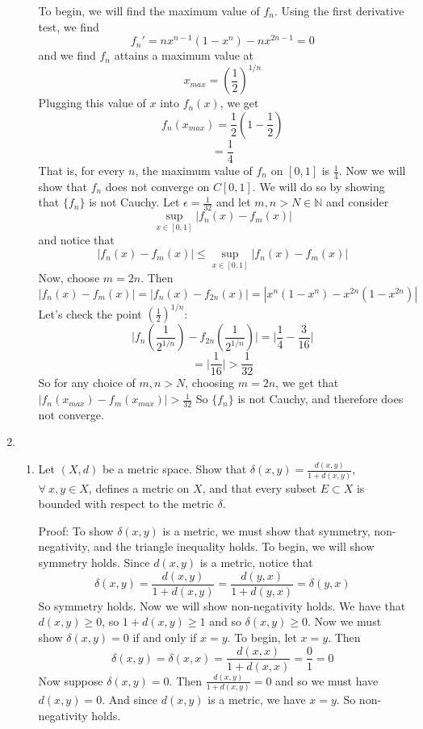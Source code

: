 \documentclass{article}
\begin{document}
\begin{enumerate}
\begin{enumerate}
        To begin, we will find the maximum value of $f_n$. Using the first derivative test, we find
        \[f_n' = nx^{n-1}(1 - x^n) - nx^{2n-1} = 0\]
        and we find $f_n$ attains a maximum value at 
        \[x_{max} = \left(\frac{1}{2}\right)^{1/n}\]
        Plugging this value of $x$ into $f_n(x)$, we get
        \[f_n(x_{max}) = \frac{1}{2}\left(1 - \frac{1}{2}\right)\]
        \[ = \frac{1}{4}\]
        That is, for every $n$, the maximum value of $f_n$ on $[0,1]$ is $\frac{1}{4}$. 
        Now we will show that $f_n$ does not converge on $C[0,1]$. We will do so by showing that $\{f_n\}$ is not Cauchy. Let $\epsilon = \frac{1}{32}$ and let $m,n > N \in \mathbb{N}$ and consider
        \[\sup_{x \in [0,1]} |f_n(x) - f_m(x)|\]
        and notice that 
        \[|f_n(x) - f_m(x)| \leq \sup_{x \in [0,1]} |f_n(x) - f_m(x)|\]
        Now, choose $m = 2n$. Then
        \[|f_n(x) - f_m(x)| = |f_n(x) - f_{2n}(x)| = |x^n(1 - x^n) - x^{2n}(1-x^{2n})|\]
        Let's check the point $\left(\frac{1}{2}\right)^{1/n}$:
        \[\Bigg|f_n\left(\frac{1}{2^{1/n}}\right) - f_{2n}\left(\frac{1}{2^{1/n}}\right)\Bigg| = \Bigg|\frac{1}{4} - \frac{3}{16}\Bigg|\]
        \[ = \Bigg|\frac{1}{16}\Bigg| > \frac{1}{32}\]
        So for any choice of $m,n > N$, choosing $m = 2n$, we get that $|f_n(x_{max}) - f_m(x_{max})| > \frac{1}{32}$
        So $\{f_n\}$ is not Cauchy, and therefore does not converge.
    \end{enumerate}
    
    \item \begin{enumerate}
        \item Let $(X,d)$ be a metric space. Show that $\delta(x,y) = \frac{d(x,y)}{1+d(x,y)}$, $\forall \: x,y \in X$, defines a metric on $X$, and that every subset $E \subset X$ is bounded with respect to the metric $\delta$.
        \newline
        
        Proof: To show $\delta(x,y)$ is a metric, we must show that symmetry, non-negativity, and the triangle inequality holds. To begin, we will show symmetry holds. Since $d(x,y)$ is a metric, notice that
        \[\delta(x,y) = \frac{d(x,y)}{1 + d(x,y)} = \frac{d(y,x)}{1 + d(y,x)} = \delta(y,x)\]
        So symmetry holds. Now we will show non-negativity holds. We have that $d(x,y) \geq 0$, so $1 + d(x,y) \geq 1$ and so $\delta(x,y) \geq 0$. Now we must show $\delta(x,y) = 0$ if and only if $x = y$. To begin, let $x = y$. Then
        \[\delta(x,y) = \delta(x,x) = \frac{d(x,x)}{1 + d(x,x)} = \frac{0}{1} = 0\]
        Now suppose $\delta(x,y) = 0$. Then $\frac{d(x,y)}{1 + d(x,y)} = 0$ and so we must have $d(x,y) = 0$. And since $d(x,y)$ is a metric, we have $x = y$.
        So non-negativity holds. 
        

\end{enumerate}
\end{enumerate}
\end{document}
